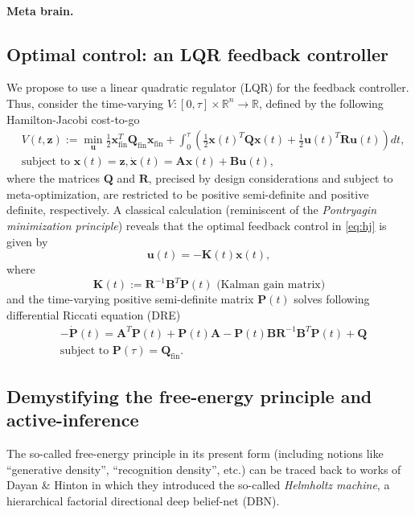 \documentclass{article} %
\def\B#1{\bm{#1}}
\newcommand{\R}{\mathbb{R}}
\def\u{\mathbf{u}}
\def\z{\mathbf{z}}
\def\A{\mathbf{A}}
\def\B{\mathbf{B}}
\def\R{\mathbf{R}}
\def\Q{\mathbf{Q}}
\def\P{\mathbf{P}}
\def\K{\mathbf{K}}
\def\x{\mathbf{x}}
\begin{document}
\paragraph{Meta brain.}

\subsection{Optimal control: an LQR feedback controller}
We propose to use a linear quadratic regulator (LQR) for the feedback controller. Thus, consider the time-varying  $V: [0, \tau] \times \mathbb R^n \rightarrow \mathbb R$, defined by the following Hamilton-Jacobi cost-to-go
\begin{equation}
  \begin{split}
    &V(t, \z) := \min_{\u} \frac{1}{2}\x_{\text{fin}}^T\Q_{\text{fin}}\x_{\text{fin}} + \int_{0}^\tau\left(\frac{1}{2}\x(t)^T\Q\x(t) + \frac{1}{2}\u(t)^T\R\u(t)\right)dt,\\
    &\text{subject to } \x(t) = \z, \dot{\x}(t) = \A\x(t) + \B\u(t),
  \end{split}
  \label{eq:hj}
\end{equation}
where the matrices $\Q$ and $\R$, precised by design considerations and subject to meta-optimization, are restricted to be positive semi-definite and positive definite, respectively. A classical calculation (reminiscent of the \textit{Pontryagin minimization principle}) reveals that the optimal feedback control in \eqref{eq:hj} is given by
\begin{equation}
  \u(t) = -\K(t)\x(t),
\end{equation}
where
\begin{equation}
  \K(t) := \R^{-1}\B^T\P(t)\text{ (Kalman gain matrix)}
\end{equation}
and the time-varying positive semi-definite matrix $\P(t)$ solves following differential Riccati equation (DRE)
\begin{equation}
\begin{split}
&-\dot{\P}(t) = \A^T\P(t) + \P(t)\A - \P(t)\B\R^{-1}\B^T\P(t) + \Q\\
&\text{subject to }\P(\tau) = \Q_{\text{fin}}.
\end{split}
\end{equation}

\subsection{Demystifying the free-energy principle and active-inference}
The so-called free-energy principle in its present form (including notions like ``generative density'', ``recognition density'', etc.) can be traced back to works of Dayan \& Hinton \cite{dayan1995helmholtz} in which they introduced the so-called \textit{Helmholtz machine}, a hierarchical factorial directional deep belief-net (DBN).
\end{document}
